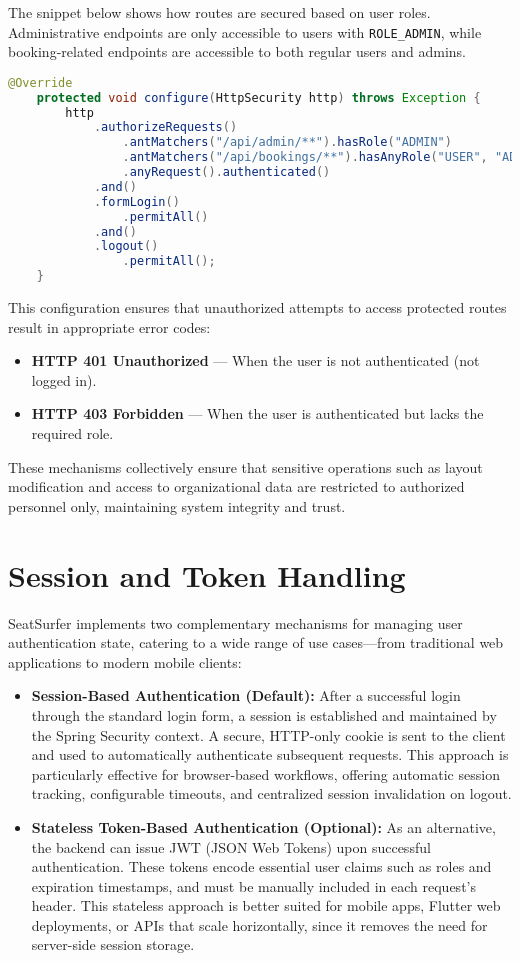 \documentclass[12pt,a4paper]{report}
\begin{document}
The snippet below shows how routes are secured based on user roles. Administrative endpoints are only accessible to users with \verb|ROLE_ADMIN|, while booking-related endpoints are accessible to both regular users and admins.

\begin{lstlisting}[language=Java, caption=Spring Security Configuration]
    @Override
    protected void configure(HttpSecurity http) throws Exception {
        http
            .authorizeRequests()
                .antMatchers("/api/admin/**").hasRole("ADMIN")
                .antMatchers("/api/bookings/**").hasAnyRole("USER", "ADMIN")
                .anyRequest().authenticated()
            .and()
            .formLogin()
                .permitAll()
            .and()
            .logout()
                .permitAll();
    }
\end{lstlisting}
This configuration ensures that unauthorized attempts to access protected routes result in appropriate error codes:
\begin{itemize}
\item \textbf{HTTP 401 Unauthorized} — When the user is not authenticated (not logged in).
\item \textbf{HTTP 403 Forbidden} — When the user is authenticated but lacks the required role.
\end{itemize}

These mechanisms collectively ensure that sensitive operations such as layout modification and access to organizational data are restricted to authorized personnel only, maintaining system integrity and trust.

\section{Session and Token Handling}

SeatSurfer implements two complementary mechanisms for managing user authentication state, catering to a wide range of use cases—from traditional web applications to modern mobile clients:

\begin{itemize}
\item \textbf{Session-Based Authentication (Default):}
After a successful login through the standard login form, a session is established and maintained by the Spring Security context. A secure, HTTP-only cookie is sent to the client and used to automatically authenticate subsequent requests. This approach is particularly effective for browser-based workflows, offering automatic session tracking, configurable timeouts, and centralized session invalidation on logout.
\item \textbf{Stateless Token-Based Authentication (Optional):}  
As an alternative, the backend can issue JWT (JSON Web Tokens) upon successful authentication. These tokens encode essential user claims such as roles and expiration timestamps, and must be manually included in each request's header. This stateless approach is better suited for mobile apps, Flutter web deployments, or APIs that scale horizontally, since it removes the need for server-side session storage.
\end{itemize}
\end{document}
